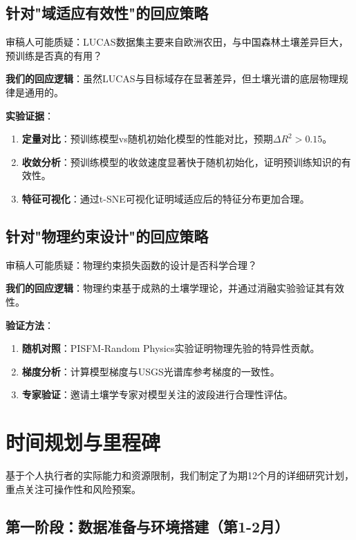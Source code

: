 \documentclass[12pt, a4paper]{article}
\begin{document}
\subsection{针对"域适应有效性"的回应策略}
审稿人可能质疑：LUCAS数据集主要来自欧洲农田，与中国森林土壤差异巨大，预训练是否真的有用？

\textbf{我们的回应逻辑}：虽然LUCAS与目标域存在显著差异，但土壤光谱的底层物理规律是通用的。

\textbf{实验证据}：
\begin{enumerate}
    \item \textbf{定量对比}：预训练模型vs随机初始化模型的性能对比，预期$\Delta R^2 > 0.15$。
    \item \textbf{收敛分析}：预训练模型的收敛速度显著快于随机初始化，证明预训练知识的有效性。
    \item \textbf{特征可视化}：通过t-SNE可视化证明域适应后的特征分布更加合理。
\end{enumerate}

\subsection{针对"物理约束设计"的回应策略}
审稿人可能质疑：物理约束损失函数的设计是否科学合理？

\textbf{我们的回应逻辑}：物理约束基于成熟的土壤学理论，并通过消融实验验证其有效性。

\textbf{验证方法}：
\begin{enumerate}
    \item \textbf{随机对照}：PISFM-Random Physics实验证明物理先验的特异性贡献。
    \item \textbf{梯度分析}：计算模型梯度与USGS光谱库参考梯度的一致性。
    \item \textbf{专家验证}：邀请土壤学专家对模型关注的波段进行合理性评估。
\end{enumerate}

\newpage
\section{时间规划与里程碑}

基于个人执行者的实际能力和资源限制，我们制定了为期12个月的详细研究计划，重点关注可操作性和风险预案。

\subsection{第一阶段：数据准备与环境搭建（第1-2月）}
\end{document}
